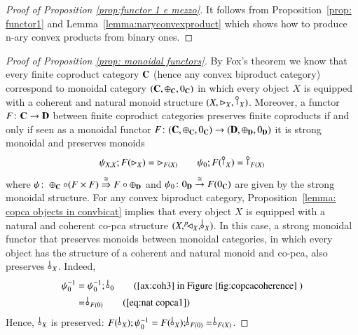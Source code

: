    \begin{proof}[Proof of Proposition \ref{prop:functor 1 e mezzo}]
    It follows from Proposition~\ref{prop: functor1} and Lemma~\ref{lemma:naryconvexproduct} which shows how to produce n-ary convex products from binary ones.
\end{proof}
   

\begin{proof}[Proof of Proposition \ref{prop: monoidal functors}]\label{proof: prop monoidal functors}
By Fox's theorem we know that every finite coproduct category $\mathbf{C}$ (hence any convex biproduct category) correspond to  monoidal category $(\mathbf{C},\oplus_{\mathbf{C}},0_{\mathbf{C}})$ in which every object $X$ is equipped with a coherent and natural monoid structure $(X,\codiag{X},\cobang{X})$. Moreover, a functor $F\colon \mathbf{C}\to \mathbf{D}$ between finite coproduct  categories preserves finite coproducts if and only if seen as a monoidal functor $F\colon(\mathbf{C},\oplus_{\mathbf{C}},0_{\mathbf{C}})\to (\mathbf{D},\oplus_{\mathbf{D}},0_{\mathbf{D}})$ it is strong monoidal  and preserves monoids
    \begin{equation*}
        \psi_{X,X};F(\codiag{X})= \codiag{F(X)} \qquad \psi_\zero;F(\cobang{X})=\cobang{F(X)}
    \end{equation*}
    where  $\psi\colon  \oplus_{\mathbf{C}}\circ (F\times F) \overset{\cong}{\Rightarrow} F\circ \oplus_{\mathbf{D}}$ and $\psi_{0}\colon 0_{\mathbf{D}}\overset{\cong}{\to} F(0_{\mathbf{C}})$ are given by the strong monoidal structure. For any convex biproduct category,  Proposition~\ref{lemma: copca objects in convbicat} implies that every object $X$ is equipped with a natural and coherent co-pca structure $(X,\diagp{X}, \bangp{X})$. In this case, a strong monoidal functor that preserves monoids between monoidal categories, in which every object has the structure of a coherent and natural monoid and co-pca, also preserves $\,\bangp{X}$. Indeed,
     \begin{align}
        \psi_0^{-1}&= \psi_0^{-1};\,\bangp{0} \tag{\ref{ax:coh3} in Figure~\ref{fig:copcacoherence} }\\
        &=\bangp{F(0)} \tag{\ref{eq:nat copca1}}
    \end{align}
    Hence, $\,\bangp{X}$ is preserved: $F(\,\bangp{X});\psi_\zero^{-1}=F(\,\bangp{X});\bangp{F(0)}=\bangp{F(X)}$. 
    

\end{proof}
